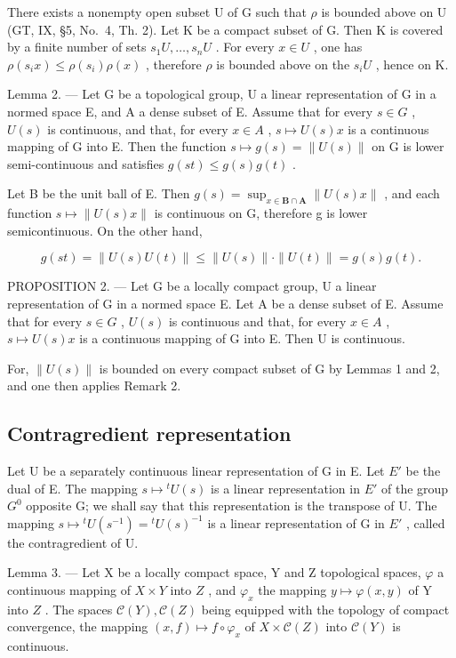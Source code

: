 There exists a nonempty open subset U of G such that \(\rho\) is bounded above on U (GT, IX, §5, No.~4, Th. 2). Let K be a compact subset of G. Then K is covered by a finite number of sets \(s_{1}U,\ldots,s_{n}U\) . For every \(x\in U\) , one has \(\rho(s_{i}x)\leqslant\rho(s_{i})\rho(x)\) , therefore \(\rho\) is bounded above on the \(s_{i}U\) , hence on K.

Lemma 2. --- Let G be a topological group, U a linear representation of G in a normed space E, and A a dense subset of E. Assume that for every \(s \in G\) , \(U(s)\) is continuous, and that, for every \(x \in A\) , \(s \mapsto U(s)x\) is a continuous mapping of G into E. Then the function \(s \mapsto g(s) = \|U(s)\|\) on G is lower semi-continuous and satisfies \(g(st) \leqslant g(s)g(t)\) .

Let B be the unit ball of E. Then \(g(s) = \sup_{x \in \mathbf{B} \cap \mathbf{A}} \|U(s)x\|\) , and each function \(s \mapsto \|U(s)x\|\) is continuous on G, therefore g is lower semicontinuous. On the other hand,

\[
g (s t) = \| U (s) U (t) \| \leqslant \| U (s) \| \cdot \| U (t) \| = g (s) g (t).
\]

PROPOSITION 2. --- Let G be a locally compact group, U a linear representation of G in a normed space E. Let A be a dense subset of E. Assume that for every \(s \in G\) , \(U(s)\) is continuous and that, for every \(x \in A\) , \(s \mapsto U(s)x\) is a continuous mapping of G into E. Then U is continuous.

For, \(\|U(s)\|\) is bounded on every compact subset of G by Lemmas 1 and 2, and one then applies Remark 2.

\subsection{Contragredient representation}

Let U be a separately continuous linear representation of G in E. Let \(E'\) be the dual of E. The mapping \(s \mapsto {}^{t}U(s)\) is a linear representation in \(E'\) of the group \(G^{0}\) opposite G; we shall say that this representation is the transpose of U. The mapping \(s \mapsto {}^{t}U(s^{-1}) = {}^{t}U(s)^{-1}\) is a linear representation of G in \(E'\) , called the contragredient of U.

Lemma 3. --- Let X be a locally compact space, Y and Z topological spaces, \(\varphi\) a continuous mapping of \(X \times Y\) into \(Z\) , and \(\varphi_x\) the mapping \(y \mapsto \varphi(x, y)\) of Y into \(Z\) . The spaces \(\mathcal{C}(Y), \mathcal{C}(Z)\) being equipped with the topology of compact convergence, the mapping \((x, f) \mapsto f \circ \varphi_x\) of \(X \times \mathcal{C}(Z)\) into \(\mathcal{C}(Y)\) is continuous.

